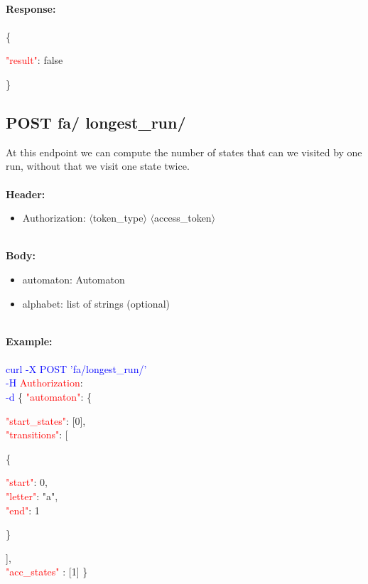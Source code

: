 \ \\
\textbf{Response:}\\
\ \\
\{
\begin{adjustwidth}{7.5 mm}{0 cm}
    \textcolor{red}{"result"}: false
\end{adjustwidth}
\}



\subsection{POST fa/ longest\_run/}
At this endpoint we can compute the number of states that can we visited by one run, without that we visit one state twice.\\
\ \\
\textbf{Header:}
\begin{itemize}
    \item Authorization: $\langle$token\_type$\rangle$ $\langle$access\_token$\rangle$
\end{itemize}
\ \\
\textbf{Body:}
\ \\
\begin{itemize}
    \item automaton: Automaton
    \item alphabet: list of strings (optional)
\end{itemize}
\ \\
\textbf{Example:} \\
\ \\
\textcolor{blue}{curl -X POST '\BaseURL fa/longest\_run/'\\
-H} \textcolor{red}{Authorization}: \Auth \\
\textcolor{blue}{-d} \{ 
     \textcolor{red}{"automaton"}: \{
     \begin{adjustwidth}{7.5 mm}{0 cm}
     \begin{adjustwidth}{7.5 mm}{0 cm}
            \textcolor{red}{"start\_states"}: [0],\\
            \textcolor{red}{"transitions"}: [
            \begin{adjustwidth}{7.5 mm}{0 cm}
            \{
               \begin{adjustwidth}{7.5 mm}{0 cm}
                    \textcolor{red}{"start"}: 0,\\
                    \textcolor{red}{"letter"}: "a",\\
                    \textcolor{red}{"end"}: 1
               \end{adjustwidth}
            \}
            \end{adjustwidth}
            ],\\
        \textcolor{red}{"acc\_states" }: [1]  \}
    \end{adjustwidth}
    \end{adjustwidth}

